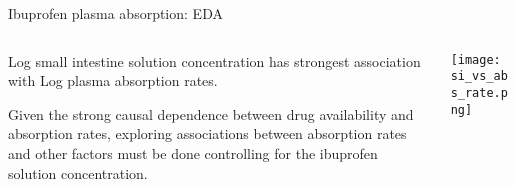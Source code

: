 \documentclass[]{beamer}
\begin{document}
\begin{frame}{Ibuprofen plasma absorption: EDA}
\small
\begin{columns}
\begin{column}{.5\textwidth}

Log small intestine solution concentration has strongest association with Log plasma absorption rates.

\bigskip

Given the strong causal dependence between drug availability and absorption rates, exploring associations between absorption rates and other factors must be done controlling for the ibuprofen solution concentration.


\end{column}
\begin{column}{.5\textwidth}
\centering
\texttt{[image: si\_vs\_abs\_rate.png]}
\end{column}
\end{columns}
\end{frame}




\end{document}
